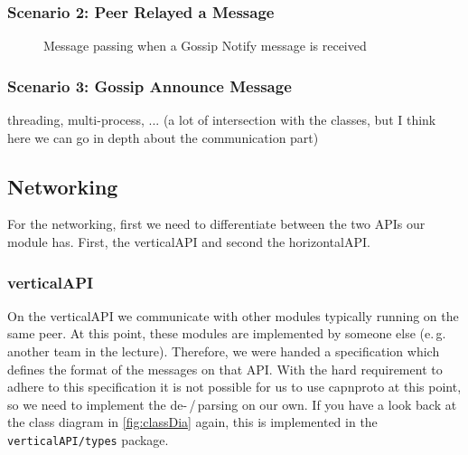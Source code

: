 \documentclass[a4paper,english,10pt,NET]{tumarticle}
\renewcommand{\eg}{\mbox{e.\,g.}\xspace} %
\begin{document}
\subsubsection{Scenario 2: Peer Relayed a Message}

\begin{figure}
	\centering
	
	\caption{Message passing when a Gossip Notify message is received}
	\label{fig:msg-relay}
\end{figure}


\subsubsection{Scenario 3: Gossip Announce Message}





% 	

threading, multi-process, ... (a lot of intersection with the classes, but I think here we can go in depth about the communication part)

\subsection{Networking} \label{sec:structureNetworking}

For the networking, first we need to differentiate between the two APIs our module has.
First, the verticalAPI and second the horizontalAPI.

\subsubsection{verticalAPI}
On the verticalAPI we communicate with other modules typically running on the same peer.
At this point, these modules are implemented by someone else (\eg another team in the lecture).
Therefore, we were handed a specification which defines the format of the messages on that API.
With the hard requirement to adhere to this specification it is not possible for us to use capnproto at this point, so we need to implement the de-\,/\,parsing on our own.
If you have a look back at the class diagram in \cref{fig:classDia} again, this is implemented in the \texttt{verticalAPI/types} package.
\end{document}
